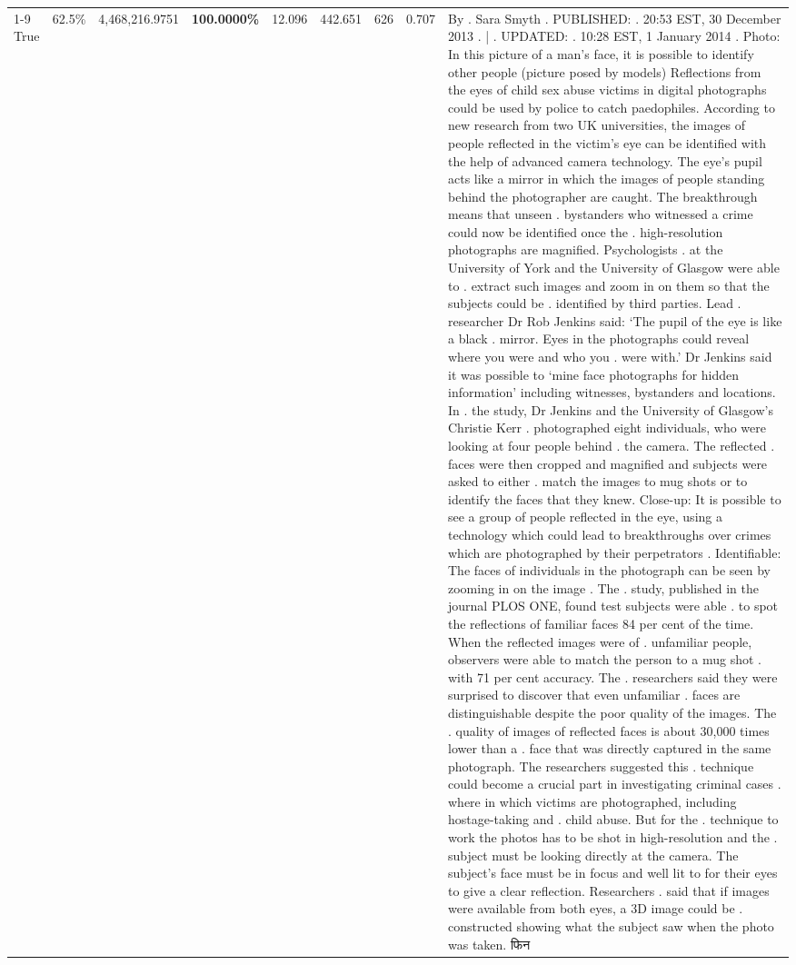 \begin{table}[H]
\begin{tabular}{lllrlllll}
\cline{1-9}
True & 62.5\% & 4,468,216.9751 & \bfseries \color{red} 100.0000\% & 12.096 & 442.651 & 626 & 0.707 & By . Sara Smyth . PUBLISHED: . 20:53 EST, 30 December 2013 . | . UPDATED: . 10:28 EST, 1 January 2014 . Photo: In this picture of a man's face, it is possible to identify other people (picture posed by models) Reflections from the eyes of child sex abuse victims in digital photographs could be used by police to catch paedophiles. According to new research from two UK universities, the images of people reflected in the victim's eye can be identified with the help of advanced camera technology. The eye's pupil acts like a mirror in which the images of people standing behind the photographer are caught. The breakthrough means that unseen . bystanders who witnessed a crime could now be identified once the . high-resolution photographs are magnified. Psychologists . at the University of York and the University of Glasgow were able to . extract such images and zoom in on them so that the subjects could be . identified by third parties. Lead . researcher Dr Rob Jenkins said: ‘The pupil of the eye is like a black . mirror. Eyes in the photographs could reveal where you were and who you . were with.' Dr Jenkins said it was possible to ‘mine face photographs for hidden information' including witnesses, bystanders and locations. In . the study, Dr Jenkins and the University of Glasgow's Christie Kerr . photographed eight individuals, who were looking at four people behind . the camera. The reflected . faces were then cropped and magnified and subjects were asked to either . match the images to mug shots or to identify the faces that they knew. Close-up: It is possible to see a group of people reflected in the eye, using a technology which could lead to breakthroughs over crimes which are photographed by their perpetrators . Identifiable: The faces of individuals in the photograph can be seen by zooming in on the image . The . study, published in the journal PLOS ONE, found test subjects were able . to spot the reflections of familiar faces 84 per cent of the time. When the reflected images were of . unfamiliar people, observers were able to match the person to a mug shot . with 71 per cent accuracy. The . researchers said they were surprised to discover that even unfamiliar . faces are distinguishable despite the poor quality of the images. The . quality of images of reflected faces is about 30,000 times lower than a . face that was directly captured in the same photograph. The researchers suggested this . technique could become a crucial part in investigating criminal cases . where in which victims are photographed, including hostage-taking and . child abuse. But for the . technique to work the photos has to be shot in high-resolution and the . subject must be looking directly at the camera. The subject's face must be in focus and well lit to for their eyes to give a clear reflection. Researchers . said that if images were available from both eyes, a 3D image could be . constructed showing what the subject saw when the photo was taken. फिन \\

\end{tabular}
\end{table}
